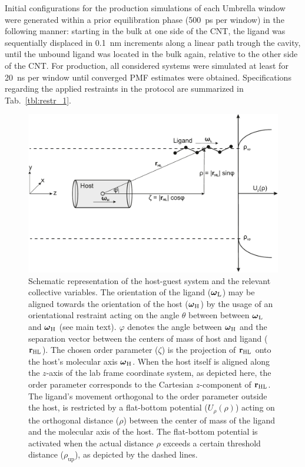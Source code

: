 \documentclass[9pt,lessons]{livecoms}
\begin{document}
Initial configurations for the production simulations of each Umbrella window were generated within a prior equilibration phase (500~ps per window) in the following manner:
starting in the bulk at one side of the CNT, the ligand was sequentially displaced in 0.1~nm increments 
along a linear path trough the cavity, until the unbound ligand was located in the bulk again, relative to the other side of the CNT.
For production, all considered systems were simulated at least for 20~ns per window until converged PMF estimates were obtained.
Specifications regarding the applied restraints in the protocol are summarized in Tab.~\ref{tbl:restr_1}.

\begin{figure}[htb!]
\includegraphics[width=\linewidth]{figures/sketch_simulation_protocol.pdf}
\caption{Schematic representation of the host-guest system and the relevant collective variables. 
The orientation of the ligand ($\text{\boldmath$\omega$}_\mathrm{L}$) may be aligned towards the orientation of the host ($\text{\boldmath$\omega$}_\mathrm{H}$) by the usage of an orientational restraint 
acting on the angle $\theta$ between between $\text{\boldmath$\omega$}_\mathrm{L}$ and $\text{\boldmath$\omega$}_\mathrm{H}$ (see main text).
$\varphi$ denotes the angle between $\text{\boldmath$\omega$}_\mathrm{H}$ and the separation vector between the centers of mass of host and ligand ($\bf{r}_\mathrm{HL}$). 
The chosen order parameter ($\zeta$) is the projection of $\bf{r}_\mathrm{HL}$ onto the host's molecular axis $\text{\boldmath$\omega$}_\mathrm{H}$.
When the host itself is aligned along the $z$-axis of the lab frame coordinate system, as depicted here, the order parameter corresponds to the Cartesian $z$-component of $\bf{r}_\mathrm{HL}$. %
The ligand's movement orthogonal to the order parameter outside the host, is restricted by a  flat-bottom potential ($U_\rho(\rho)$) acting on the orthogonal distance ($\rho$) 
between the center of mass of the ligand and the molecular axis of the host. 
The flat-bottom potential is activated when the actual distance $\rho$ exceeds a certain threshold distance ($\rho_\mathrm{up}$), as depicted by the dashed lines.}
\label{fig:host_guest_sketch}
\end{figure}
\end{document}
